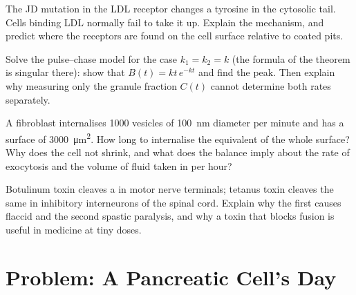 \begin{exercise}[$\star\star$]\label{exo:b3:membrane-traffic:9}
The JD mutation in the LDL receptor changes a tyrosine in the cytosolic
tail. Cells binding LDL normally fail to take it up. Explain the
mechanism, and predict where the receptors are found on the cell
surface relative to coated pits.
\end{exercise}

\begin{exercise}[$\star\star\star$]\label{exo:b3:membrane-traffic:10}
Solve the pulse--chase model for the case $k_{1} = k_{2} = k$ (the
formula of the theorem is singular there): show that $B(t) = kt\,e^{-kt}$
and find the peak. Then explain why measuring only the granule
fraction $C(t)$ cannot determine both rates separately.
\end{exercise}

\begin{exercise}[$\star\star\star$]\label{exo:b3:membrane-traffic:11}
A fibroblast internalises \num{1000}  vesicles of \qty{100}{nm}
diameter per minute and has a surface of \qty{3000}{\micro m^2}. How
long to internalise the equivalent of the whole surface? Why does the
cell not shrink, and what does the balance imply about the rate of
exocytosis and the volume of fluid taken in per hour?
\end{exercise}

\begin{exercise}[$\star\star\star$]\label{exo:b3:membrane-traffic:12}
Botulinum toxin cleaves a  in motor nerve terminals; tetanus
toxin cleaves the same  in inhibitory interneurons of the spinal
cord. Explain why the first causes flaccid and the second spastic
paralysis, and why a toxin that blocks fusion is useful in medicine at
tiny doses.
\end{exercise}

\section{Problem: A Pancreatic Cell's Day}

